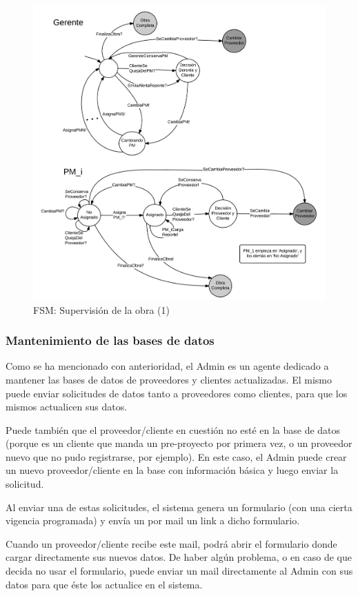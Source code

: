 \begin{figure}[H]
\centering
\includegraphics[width=0.8\linewidth]{diag/nuevos/fsm-obra2.png}
\caption{FSM: Supervisión de la obra (1)}
\label{fsm-firmcont2}
\end{figure}

	\subsubsection{Mantenimiento de las bases de datos}
Como se ha mencionado con anterioridad, el Admin es un agente dedicado 
a mantener las bases de datos de proveedores y clientes actualizadas. 
El mismo puede enviar solicitudes de datos tanto a proveedores como clientes, 
para que los mismos actualicen sus datos. 

Puede también que el proveedor/cliente 
en cuestión no esté en la base de datos (porque es un cliente que manda un pre-proyecto 
por primera vez, o un proveedor nuevo que no pudo registrarse, por ejemplo). 
En este caso, el Admin puede crear un nuevo proveedor/cliente en la base 
con información básica y luego enviar la solicitud. 

Al enviar una de estas solicitudes, 
el sistema genera un formulario (con una cierta vigencia programada) y envía 
un por mail un link a dicho formulario. 

Cuando un proveedor/cliente recibe este mail, podrá abrir el formulario 
donde cargar directamente sus nuevos datos. De haber algún problema, o en caso 
de que decida no usar el formulario, puede enviar un mail directamente al Admin 
con sus datos para que éste los actualice en el sistema. 

